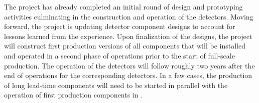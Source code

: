 The  project has already completed an initial round of design 
and prototyping activities culminating in the construction and operation 
of the  detectors.  Moving forward, the project is 
updating detector component designs to account for lessons learned from 
the  experience.  Upon finalization of the designs, the 
project will construct first production versions of all components that 
will be installed and operated in a second phase of  
operations prior to the start of full-scale production.  The operation 
of the  detectors will follow roughly two years after
the end of operations for the corresponding  detectors.
In a few cases, the production of long lead-time components will need to 
be started in parallel with the operation of first production components 
in .
